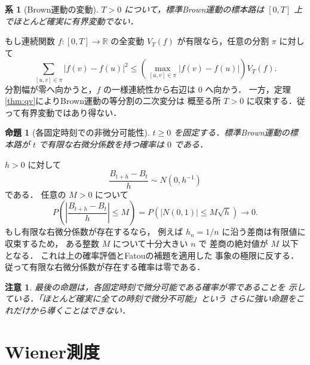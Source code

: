 \documentclass[a5paper,10pt,onecolumn]{jsarticle}
\makeatletter
\theoremstyle{mathnotetheorem}
\newtheorem{proposition}[theorem]{命題}
\newtheorem{corollary}[theorem]{系}
\newtheorem{remark}[theorem]{注意}
\renewcommand{\proofname}{証明}
\renewenvironment{proof}[1][\proofname]{%
  \par\pushQED{\qed}\normalfont\topsep4\p@\@plus2\p@\relax
  \trivlist\item[\hskip\labelsep\bfseries #1]\ignorespaces
}{\popQED\endtrivlist\@endpefalse}
\makeatother
\begin{document}
\begin{corollary}[Brown運動の変動]\label{cor:unbounded-variation}
$T>0$ について，標準Brown運動の標本路は
$[0,T]$ 上でほとんど確実に有界変動でない．
\end{corollary}
\begin{proof}
もし連続関数 $f:[0,T]\to\mathbb R$ の全変動
$V_T(f)$ が有限なら，任意の分割 $\pi$ に対して
\[
 \sum_{[u,v]\in\pi}|f(v)-f(u)|^2
 \le\left(\max_{[u,v]\in\pi}|f(v)-f(u)|\right)V_T(f).
\]
分割幅が零へ向かうと，$f$ の一様連続性から右辺は $0$ へ向かう．
一方，定理\ref{thm:qv}によりBrown運動の等分割の二次変分は
概至る所 $T>0$ に収束する．従って有界変動ではあり得ない．
\end{proof}

\begin{proposition}[各固定時刻での非微分可能性]
$t\ge0$ を固定する．標準Brown運動の標本路が
$t$ で有限な右微分係数を持つ確率は $0$ である．
\end{proposition}
\begin{proof}
$h>0$ に対して
\[
 \frac{B_{t+h}-B_t}{h}\sim N(0,h^{-1})
\]
である．
任意の $M>0$ について
\[
 P\left(\left|\frac{B_{t+h}-B_t}{h}\right|\le M\right)
 =P(|N(0,1)|\le M\sqrt h)\longrightarrow0.
\]
もし有限な右微分係数が存在するなら，
例えば $h_n=1/n$ に沿う差商は有限値に収束するため，
ある整数 $M$ について十分大きい $n$ で
差商の絶対値が $M$ 以下となる．
これは上の確率評価とFatouの補題を適用した
事象の極限に反する．
従って有限な右微分係数が存在する確率は零である．
\end{proof}

\begin{remark}
最後の命題は，各固定時刻で微分可能である確率が零であることを
示している．「ほとんど確実に全ての時刻で微分不可能」という
さらに強い命題をこれだけから導くことはできない．
\end{remark}

\section{Wiener測度}
\end{document}
